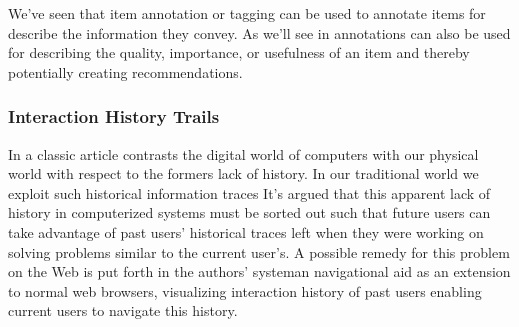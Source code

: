 


We've seen that item annotation or tagging can be used to annotate items for
describe the information they convey. As we'll see in
annotations can also be used for describing the quality, importance, or
usefulness of an item and thereby potentially creating recommendations.

\subsubsection{Interaction History Trails}
\label{section:background.social.navigation.applied.forms.interaction.history}

In a classic article \citet{wexelblat99} contrasts the digital world of
computers with our physical world with respect to the formers lack of history.
In our traditional world we exploit such historical information traces
It's argued that this apparent lack of history in computerized systems must
be sorted out such that future users can take advantage
of past users' historical traces left when they were working
on solving problems similar to the current user's.
A possible remedy for this problem on the Web is put forth in the authors'
 system\dash{}an navigational aid as an extension to
normal web browsers, visualizing interaction history of past users enabling
current users to navigate this history.

